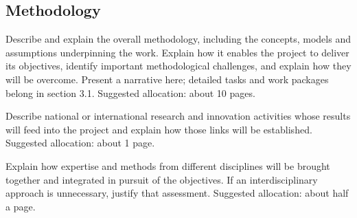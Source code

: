 

\subsection{Methodology}\label{sec:methodology}

\begin{heguidance}
Describe and explain the overall methodology, including the concepts, models and
assumptions underpinning the work. Explain how it enables the project to deliver
its objectives, identify important methodological challenges, and explain how
they will be overcome. Present a narrative here; detailed tasks and work packages
belong in section 3.1. Suggested allocation: about 10 pages.
\end{heguidance}

\begin{heguidance}
Describe national or international research and innovation activities whose
results will feed into the project and explain how those links will be
established. Suggested allocation: about 1 page.
\end{heguidance}

\begin{heguidance}
Explain how expertise and methods from different disciplines will be brought
together and integrated in pursuit of the objectives. If an interdisciplinary
approach is unnecessary, justify that assessment. Suggested allocation: about
half a page.
\end{heguidance}


